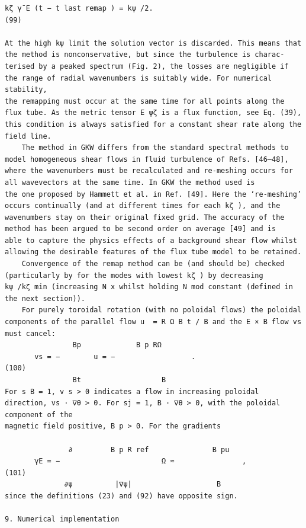 \documentclass[a4paper]{article}
\newcommand{\gkwpagefont}{\fontsize{6.0pt}{7.55pt}\selectfont}
\begin{document}
\begin{Verbatim}[fontsize=\gkwpagefont]
       kζ γ̄ E (t − t last remap ) = kψ /2.                                                                                             (99)

At the high kψ limit the solution vector is discarded. This means that the method is nonconservative, but since the turbulence is charac-
terised by a peaked spectrum (Fig. 2), the losses are negligible if the range of radial wavenumbers is suitably wide. For numerical stability,
the remapping must occur at the same time for all points along the flux tube. As the metric tensor E ψζ is a flux function, see Eq. (39),
this condition is always satisfied for a constant shear rate along the field line.
    The method in GKW differs from the standard spectral methods to model homogeneous shear flows in fluid turbulence of Refs. [46–48],
where the wavenumbers must be recalculated and re-meshing occurs for all wavevectors at the same time. In GKW the method used is
the one proposed by Hammett et al. in Ref. [49]. Here the ‘re-meshing’ occurs continually (and at different times for each kζ ), and the
wavenumbers stay on their original fixed grid. The accuracy of the method has been argued to be second order on average [49] and is
able to capture the physics effects of a background shear flow whilst allowing the desirable features of the flux tube model to be retained.
    Convergence of the remap method can be (and should be) checked (particularly by for the modes with lowest kζ ) by decreasing
kψ /kζ min (increasing N x whilst holding N mod constant (defined in the next section)).
    For purely toroidal rotation (with no poloidal flows) the poloidal components of the parallel flow u  = R Ω B t / B and the E × B flow vs
must cancel:
                Bp             B p RΩ
       vs = −        u = −                  .                                                                                          (100)
                Bt                   B
For s B = 1, v s > 0 indicates a flow in increasing poloidal direction, vs · ∇θ > 0. For sj = 1, B · ∇θ > 0, with the poloidal component of the
magnetic field positive, B p > 0. For the gradients
                                        
               ∂         B p R ref               B pu
       γE = −                        Ω ≈                ,                                                                               (101)
              ∂ψ          |∇ψ|                    B
since the definitions (23) and (92) have opposite sign.

9. Numerical implementation


\end{Verbatim}
\end{document}
